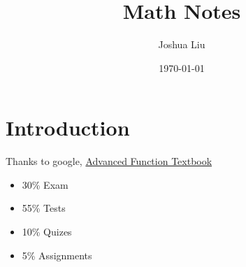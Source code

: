 \documentclass[11pt]{article}
\title{Math Notes}
\author{Joshua Liu}
\date{\today}
\begin{document}
\maketitle
\section{Introduction}
Thanks to google, \hyperlink{https://docs.google.com/viewer?a=v&pid=sites&srcid=b2Nkc2IuY2F8bXItbGV2ZXJzLXdvb2Ryb2ZmZS1oc3xneDo1NWNkMGZhODA2MTVmNDFk}{Advanced Function Textbook}
\begin{itemize}
    \item 30\% Exam
    \item 55\% Tests
    \item 10\% Quizes
    \item 5\% Assignments
\end{itemize}








\end{document}
